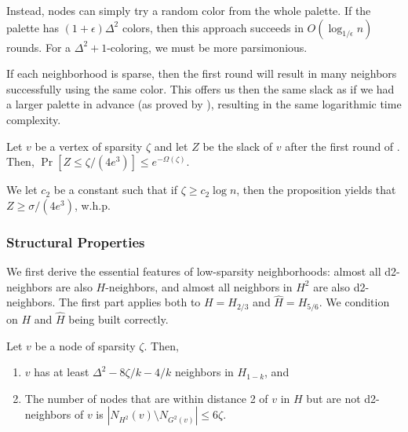 Instead, nodes can simply try a random color from the whole palette. If the palette has $(1+\epsilon)\Delta^2$ colors, then this approach succeeds in $O(\log_{1/\epsilon} n)$ rounds. For a $\Delta^2+1$-coloring, we must be more parsimonious. 

If each neighborhood is sparse, then the first round will result in many neighbors successfully using the same color. 
This offers us then the same slack as if we had a larger palette in advance (as proved by \cite{EPS15}), resulting in the same logarithmic time complexity.

\begin{proposition}[\cite{EPS15}, Lemma 3.1]
Let $v$ be a vertex of sparsity $\zeta$ and let $Z$ be the slack of $v$ after the first round of . Then, 
 $\Pr[Z \le \zeta/(4 e^3)] \le e^{-\Omega(\zeta)}$.
\label{P:sparsity}
\end{proposition}

We let $c_2$ be a constant such that if $\zeta \ge c_2\log n$, then the proposition yields that $Z \ge \sigma/(4e^3)$, w.h.p.

\subsubsection{Structural Properties} 
\label{ssec:struct}
We first derive the essential features of low-sparsity neighborhoods: almost all d2-neighbors are also $H$-neighbors, and almost all neighbors in $H^2$ are also d2-neighbors.
The first part applies both to $H = H_{2/3}$ and $\hat{H} = H_{5/6}$. We condition on $H$ and $\hat{H}$ being built correctly.

\begin{lemma}
Let $v$ be a node of sparsity $\zeta$.
Then,
\begin{enumerate}
    \item $v$ has at least $\Delta^2 - 8\zeta/k -4/k$ neighbors in $H_{1-k}$, and
    \item The number of nodes that are within distance 2 of $v$ in $H$ but are not d2-neighbors of $v$ is
$|N_{H^2}(v) \setminus N_{G^2(v)}| \le 6\zeta$.
\end{enumerate}
\label{L:h-degree}
\end{lemma}
 


